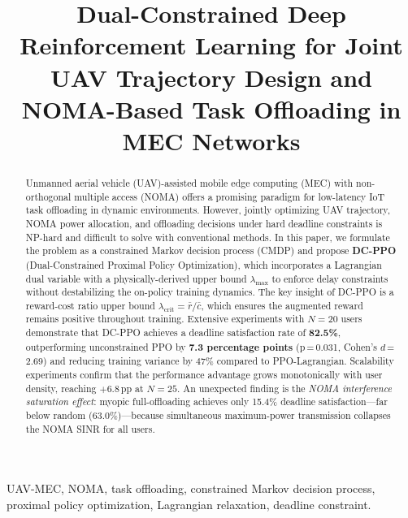 \documentclass[journal]{IEEEtran}
\begin{document}
\title{Dual-Constrained Deep Reinforcement Learning for Joint UAV
Trajectory Design and NOMA-Based Task Offloading in MEC Networks}

\author{
}

\maketitle

\begin{abstract}
Unmanned aerial vehicle (UAV)-assisted mobile edge computing (MEC)
with non-orthogonal multiple access (NOMA) offers a promising
paradigm for low-latency IoT task offloading in dynamic environments.
However, jointly optimizing UAV trajectory, NOMA power allocation,
and offloading decisions under hard deadline constraints is
NP-hard and difficult to solve with conventional methods.
In this paper, we formulate the problem as a constrained Markov
decision process (CMDP) and propose \textbf{DC-PPO}
(Dual-Constrained Proximal Policy Optimization), which incorporates
a Lagrangian dual variable with a physically-derived upper bound
$\lambda_{\max}$ to enforce delay constraints without destabilizing
the on-policy training dynamics.
The key insight of DC-PPO is a reward-cost ratio upper bound
$\lambda_{\text{crit}} = \bar{r}/\bar{c}$, which ensures the
augmented reward remains positive throughout training.
Extensive experiments with $N{=}20$ users demonstrate that
DC-PPO achieves a deadline satisfaction rate of \textbf{82.5\%},
outperforming unconstrained PPO by \textbf{7.3 percentage points}
(p\,=\,0.031, Cohen's $d$\,=\,2.69) and reducing training
variance by 47\% compared to PPO-Lagrangian.
Scalability experiments confirm that the performance advantage
grows monotonically with user density, reaching $+6.8$\,pp
at $N{=}25$.
An unexpected finding is the \emph{NOMA interference saturation
effect}: myopic full-offloading achieves only 15.4\% deadline
satisfaction---far below random (63.0\%)---because simultaneous
maximum-power transmission collapses the NOMA SINR for all users.
\end{abstract}

\begin{IEEEkeywords}
UAV-MEC, NOMA, task offloading, constrained Markov decision process,
proximal policy optimization, Lagrangian relaxation, deadline constraint.
\end{IEEEkeywords}
\end{document}
